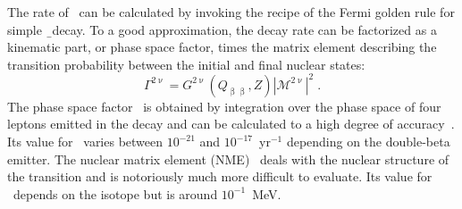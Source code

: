 The rate of \nnbb\ can be calculated by invoking the recipe of the Fermi golden
rule for simple \b\ decay. To a good approximation, the decay rate can be
factorized as a kinematic part, or phase space factor, times the matrix element
describing the transition probability between the initial and final nuclear
states:
\[
  \Gamma^{2\upnu} = G^{2\upnu}(Q_{\upbeta\upbeta},Z) |\mathcal{M}^{2\upnu}|^2 \;.
\]
The phase space factor \psft\ is obtained by integration over the phase space
of four leptons emitted in the decay and can be calculated to a high degree of
accuracy~\cite{Kotila2012, Stoica2013}. Its value for \nnbb\ varies between
$10^{-21}$ and $10^{-17}$~yr$^{-1}$ depending on the double-beta emitter.
The nuclear matrix element (NME) \nmet\ deals with the nuclear structure of the
transition and is notoriously much more difficult to evaluate. Its value for
\nnbb\ depends on the isotope but is around $10^{-1}$~MeV.


